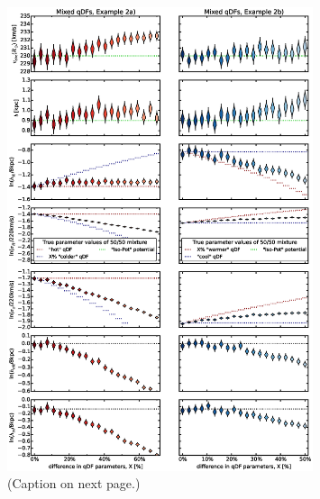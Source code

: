 
\begin{figure}
\centering
\includegraphics[width=0.8\textwidth]{figs/isoSphFlexMixDiff_violins.eps}
\caption{(Caption on next page.)}
\end{figure}



